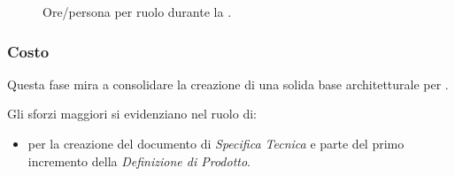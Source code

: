 \begin{figure}[H]
\caption{Ore/persona per ruolo durante la \PA.}
\label{fig:pa2}

\end{figure}

\pagebreak
\subsubsection{Costo \PA}
\introcosto{\PA}
Questa fase mira a consolidare la creazione di una solida base architetturale per \proj.

Gli sforzi maggiori si evidenziano nel ruolo di:
\begin{itemize}
\item {\PJx} per la creazione del documento di \emph{Specifica Tecnica} e parte del primo incremento della \emph{Definizione di Prodotto}.
\end{itemize}

